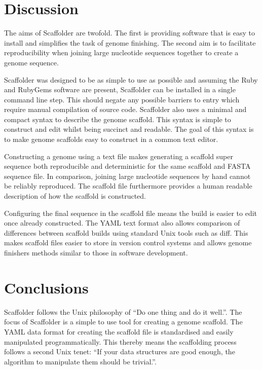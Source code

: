 \documentclass[10pt]{bmc_article}
\newenvironment{bmcformat}{\begin{raggedright}\baselineskip20pt\sloppy\setboolean{publ}{false}}{\end{raggedright}\baselineskip20pt\sloppy}
\begin{document}
\begin{bmcformat}
\section*{Discussion} %

The aims of Scaffolder are twofold. The first is providing software that is
easy to install and simplifies the task of genome finishing. The second aim is
to facilitate reproducibility when joining large nucleotide sequences together
to create a genome sequence. \pb

Scaffolder was designed to be as simple to use as possible and assuming the
Ruby and RubyGems software are present, Scaffolder can be installed in a single
command line step. This should negate any possible barriers to entry which
require manual compilation of source code. Scaffolder also uses a minimal and
compact syntax to describe the genome scaffold. This syntax is simple to
construct and edit whilst being succinct and readable. The goal of this syntax
is to make genome scaffolds easy to construct in a common text editor. \pb

Constructing a genome using a text file makes generating a scaffold super
sequence both reproducible and deterministic for the same scaffold and FASTA
sequence file. In comparison, joining large nucleotide sequences by hand cannot
be reliably reproduced. The scaffold file furthermore provides a human readable
description of how the scaffold is constructed. \pb

Configuring the final sequence in the scaffold file means the build is easier
to edit once already constructed. The YAML text format also allows comparison
of differences between scaffold builds using standard Unix tools such as diff.
This makes scaffold files easier to store in version control systems and allows
genome finishers methods similar to those in software development. \pb 

\clearpage

\section*{Conclusions} %

Scaffolder follows the Unix philosophy of ``Do one thing and do it well.''. The
focus of Scaffolder is a simple to use tool for creating a genome scaffold. The
YAML data format for creating the scaffold file is standardised and easily
manipulated programmatically. This thereby means the scaffolding process
follows a second Unix tenet: ``If your data structures are good enough, the
algorithm to manipulate them should be trivial.''.


\end{bmcformat}
\end{document}
